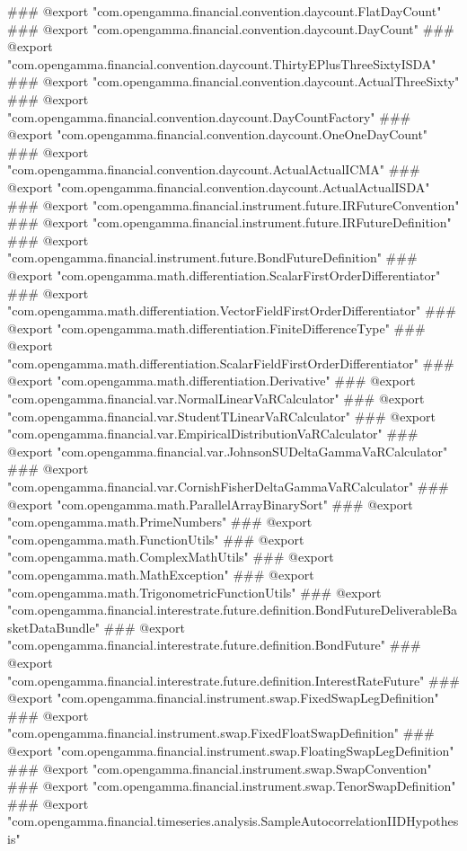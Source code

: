 ### @export "com.opengamma.financial.convention.daycount.FlatDayCount"
### @export "com.opengamma.financial.convention.daycount.DayCount"
### @export "com.opengamma.financial.convention.daycount.ThirtyEPlusThreeSixtyISDA"
### @export "com.opengamma.financial.convention.daycount.ActualThreeSixty"
### @export "com.opengamma.financial.convention.daycount.DayCountFactory"
### @export "com.opengamma.financial.convention.daycount.OneOneDayCount"
### @export "com.opengamma.financial.convention.daycount.ActualActualICMA"
### @export "com.opengamma.financial.convention.daycount.ActualActualISDA"
### @export "com.opengamma.financial.instrument.future.IRFutureConvention"
### @export "com.opengamma.financial.instrument.future.IRFutureDefinition"
### @export "com.opengamma.financial.instrument.future.BondFutureDefinition"
### @export "com.opengamma.math.differentiation.ScalarFirstOrderDifferentiator"
### @export "com.opengamma.math.differentiation.VectorFieldFirstOrderDifferentiator"
### @export "com.opengamma.math.differentiation.FiniteDifferenceType"
### @export "com.opengamma.math.differentiation.ScalarFieldFirstOrderDifferentiator"
### @export "com.opengamma.math.differentiation.Derivative"
### @export "com.opengamma.financial.var.NormalLinearVaRCalculator"
### @export "com.opengamma.financial.var.StudentTLinearVaRCalculator"
### @export "com.opengamma.financial.var.EmpiricalDistributionVaRCalculator"
### @export "com.opengamma.financial.var.JohnsonSUDeltaGammaVaRCalculator"
### @export "com.opengamma.financial.var.CornishFisherDeltaGammaVaRCalculator"
### @export "com.opengamma.math.ParallelArrayBinarySort"
### @export "com.opengamma.math.PrimeNumbers"
### @export "com.opengamma.math.FunctionUtils"
### @export "com.opengamma.math.ComplexMathUtils"
### @export "com.opengamma.math.MathException"
### @export "com.opengamma.math.TrigonometricFunctionUtils"
### @export "com.opengamma.financial.interestrate.future.definition.BondFutureDeliverableBasketDataBundle"
### @export "com.opengamma.financial.interestrate.future.definition.BondFuture"
### @export "com.opengamma.financial.interestrate.future.definition.InterestRateFuture"
### @export "com.opengamma.financial.instrument.swap.FixedSwapLegDefinition"
### @export "com.opengamma.financial.instrument.swap.FixedFloatSwapDefinition"
### @export "com.opengamma.financial.instrument.swap.FloatingSwapLegDefinition"
### @export "com.opengamma.financial.instrument.swap.SwapConvention"
### @export "com.opengamma.financial.instrument.swap.TenorSwapDefinition"
### @export "com.opengamma.financial.timeseries.analysis.SampleAutocorrelationIIDHypothesis"
